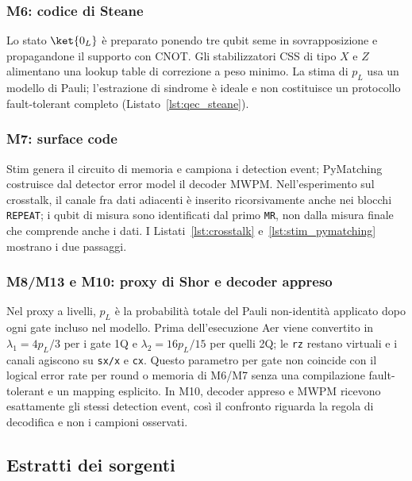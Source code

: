 \begin{onehalfspace}
\subsubsection{M6: codice di Steane}

Lo stato $\ket{0_L}$ è preparato ponendo tre qubit seme in sovrapposizione e
propagandone il supporto con CNOT. Gli stabilizzatori CSS di tipo $X$ e $Z$ alimentano
una lookup table di correzione a peso minimo. La stima di $p_L$ usa un modello di Pauli;
l'estrazione di sindrome è ideale e non costituisce un protocollo fault-tolerant
completo (Listato~\ref{lst:qec_steane}).

\subsubsection{M7: surface code}

Stim genera il circuito di memoria e campiona i detection event; PyMatching costruisce
dal detector error model il decoder \ac{MWPM}. Nell'esperimento sul crosstalk, il canale
fra dati adiacenti è inserito ricorsivamente anche nei blocchi \texttt{REPEAT}; i qubit
di misura sono identificati dal primo \texttt{MR}, non dalla misura finale che comprende
anche i dati. I Listati~\ref{lst:crosstalk} e~\ref{lst:stim_pymatching} mostrano i due
passaggi.

\subsubsection{M8/M13 e M10: proxy di Shor e decoder appreso}

Nel proxy a livelli, $p_L$ è la probabilità totale del Pauli non-identità applicato dopo
ogni gate incluso nel modello. Prima dell'esecuzione Aer viene convertito in
$\lambda_1=4p_L/3$ per i gate 1Q e $\lambda_2=16p_L/15$ per quelli 2Q; le \texttt{rz}
restano virtuali e i canali agiscono su \texttt{sx/x} e \texttt{cx}. Questo parametro
per gate non coincide con il logical error rate per round o memoria di M6/M7 senza una
compilazione fault-tolerant e un mapping esplicito. In M10, decoder appreso e
\ac{MWPM} ricevono esattamente gli stessi detection event, così il confronto riguarda la
regola di decodifica e non i campioni osservati.

\end{onehalfspace}

\subsection{Estratti dei sorgenti}


